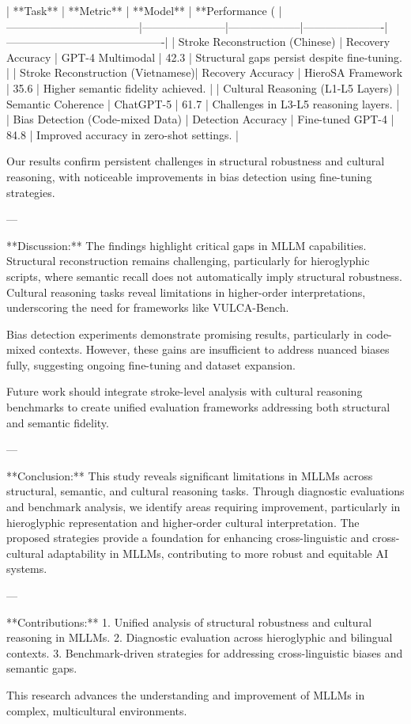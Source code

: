 | **Task**                          | **Metric**            | **Model**          | **Performance (%
|------------------------------------|-----------------------|--------------------|----------------------|-------------------------------------------|  
| Stroke Reconstruction (Chinese)   | Recovery Accuracy     | GPT-4 Multimodal   | 42.3                | Structural gaps persist despite fine-tuning. |  
| Stroke Reconstruction (Vietnamese)| Recovery Accuracy     | HieroSA Framework  | 35.6                | Higher semantic fidelity achieved.         |  
| Cultural Reasoning (L1-L5 Layers) | Semantic Coherence    | ChatGPT-5          | 61.7                | Challenges in L3-L5 reasoning layers.      |  
| Bias Detection (Code-mixed Data)  | Detection Accuracy    | Fine-tuned GPT-4   | 84.8                | Improved accuracy in zero-shot settings.   |  

Our results confirm persistent challenges in structural robustness and cultural reasoning, with noticeable improvements in bias detection using fine-tuning strategies.

---

**Discussion:**  
The findings highlight critical gaps in MLLM capabilities. Structural reconstruction remains challenging, particularly for hieroglyphic scripts, where semantic recall does not automatically imply structural robustness. Cultural reasoning tasks reveal limitations in higher-order interpretations, underscoring the need for frameworks like VULCA-Bench.

Bias detection experiments demonstrate promising results, particularly in code-mixed contexts. However, these gains are insufficient to address nuanced biases fully, suggesting ongoing fine-tuning and dataset expansion.

Future work should integrate stroke-level analysis with cultural reasoning benchmarks to create unified evaluation frameworks addressing both structural and semantic fidelity.

---

**Conclusion:**  
This study reveals significant limitations in MLLMs across structural, semantic, and cultural reasoning tasks. Through diagnostic evaluations and benchmark analysis, we identify areas requiring improvement, particularly in hieroglyphic representation and higher-order cultural interpretation. The proposed strategies provide a foundation for enhancing cross-linguistic and cross-cultural adaptability in MLLMs, contributing to more robust and equitable AI systems.

---

**Contributions:**  
1. Unified analysis of structural robustness and cultural reasoning in MLLMs.  
2. Diagnostic evaluation across hieroglyphic and bilingual contexts.  
3. Benchmark-driven strategies for addressing cross-linguistic biases and semantic gaps.  

This research advances the understanding and improvement of MLLMs in complex, multicultural environments.